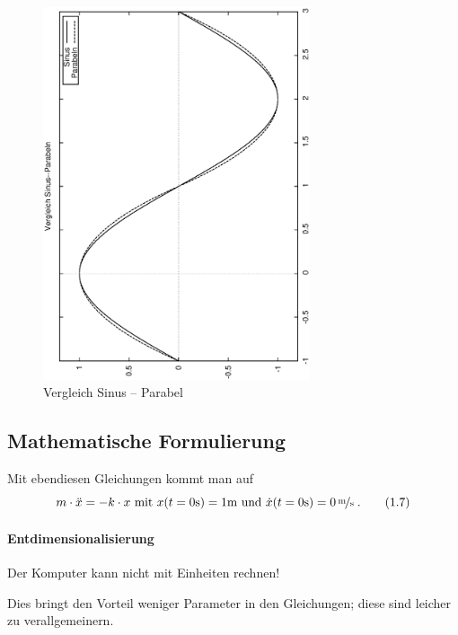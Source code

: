\documentclass[a4paper]{book}
\begin{document}
\begin{figure}
  \centering
  \includegraphics[angle=-90,width=0.7\textwidth]{./bilder/sin-par-1}
  \caption{Vergleich Sinus -- Parabel}
  \label{fig:sinus-parabel-vgl}
\end{figure}




\subsection{Mathematische Formulierung}
\label{sec:mathematische_formulierung}

Mit ebendiesen Gleichungen kommt man auf
\begin{equation}
  \label{eq:3}
  m \cdot \ddot x = - k \cdot x \text{ mit } x(t = 0\unit s) = 1\unit m
  \text{ und } \dot x(t = 0 \unit s) = \unitfrac[0]{m}{s} \;.
\tag{1.7}
\end{equation}

\paragraph{Entdimensionalisierung}
\label{sec:entdimensionalisierung}



\begin{Wichtig}
Der Komputer kann nicht mit Einheiten rechnen!  
\end{Wichtig}
 Dies bringt den
Vorteil weniger
Parameter in den Gleichungen; diese sind leicher zu verallgemeinern.
\end{document}
